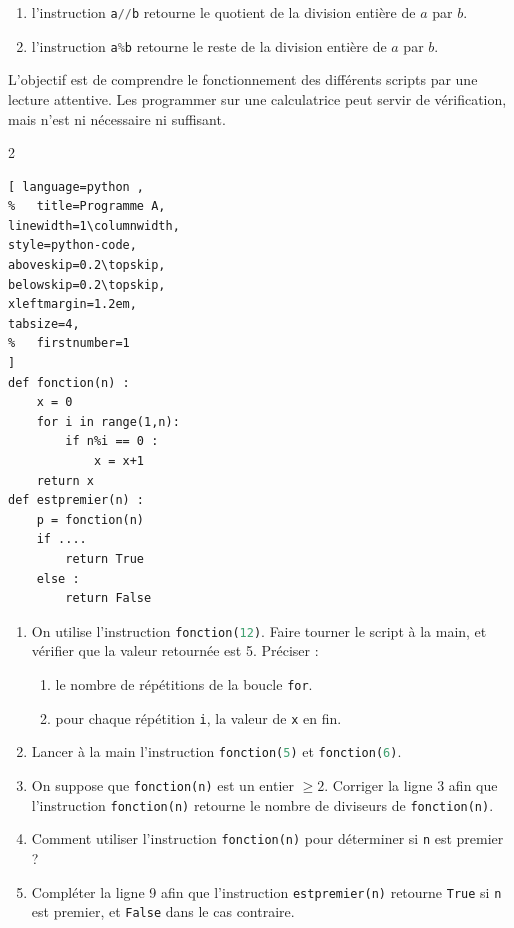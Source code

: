 \begin{tBox}
	\begin{enumerate}[label={\textbullet}, leftmargin=*]   
	\item l'instruction \lstinline[language=python ,style=python-code]|a//b| retourne le quotient de la division entière de $a$ par $b$.
	\item l'instruction \lstinline[language=python ,style=python-code]|a%b| retourne le reste de la division entière de $a$ par $b$.
	\end{enumerate}
\end{tBox} 
L'objectif est de comprendre le fonctionnement des différents scripts par une lecture attentive. Les programmer sur une calculatrice peut servir de vérification, mais n'est ni nécessaire ni suffisant.
\begin{exercise}\hfill  
\begin{multicols}{2} 
\begin{lstlisting}[ language=python , 
%	title=Programme A,   
linewidth=1\columnwidth,
style=python-code,    
aboveskip=0.2\topskip,
belowskip=0.2\topskip,
xleftmargin=1.2em,
tabsize=4,
%	firstnumber=1  
]
def fonction(n) :
	x = 0
	for i in range(1,n):
		if n%i == 0 :
			x = x+1
	return x
def estpremier(n) :
	p = fonction(n)
	if ....
		return True
	else :
		return False
\end{lstlisting}
\end{multicols} 
\begin{enumerate}[label={\arabic*)}, leftmargin=*]   
	\item On utilise l'instruction \lstinline[language=python ,style=python-code]|fonction(12)|. Faire tourner le script à la main, et vérifier que la valeur retournée est 5. Préciser :
		\begin{enumerate}[label={\alph*)}, leftmargin=*]   
			\item le nombre de répétitions de la boucle \lstinline|for|.
			\item pour chaque répétition \lstinline|i|, la valeur de \lstinline|x| en fin.
		\end{enumerate}
	\item Lancer à la main l'instruction \lstinline[language=python ,style=python-code]|fonction(5)| et \lstinline[language=python ,style=python-code]|fonction(6)|.
	\item On suppose que \lstinline[language=python ,style=python-code]|fonction(n)| est un entier $\geqslant 2$. 
	Corriger la ligne $3$ afin que l'instruction \lstinline[language=python ,style=python-code]|fonction(n)| retourne le nombre de diviseurs de \lstinline[language=python ,style=python-code]|fonction(n)|.
	\item Comment utiliser l'instruction \lstinline|fonction(n)| pour déterminer si \lstinline|n| est premier ?
	\item Compléter la ligne 9 afin que l'instruction \lstinline|estpremier(n)| retourne \lstinline|True| si \lstinline|n| est premier, et \lstinline|False| dans le cas contraire. 
\end{enumerate} 
\end{exercise}
